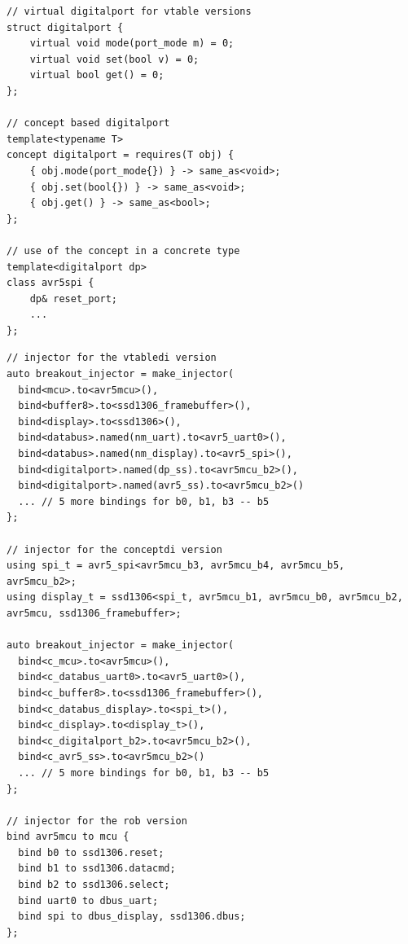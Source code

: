 \documentclass[10pt,sigplan,screen,anonymous]{acmart}
\begin{document}
\begin{lstlisting}[float=bp, caption=C++ interface implementation using abstract struct and concepts., label=lst:cppintfsconcept]
// virtual digitalport for vtable versions
struct digitalport {
    virtual void mode(port_mode m) = 0;
    virtual void set(bool v) = 0;
    virtual bool get() = 0;
};

// concept based digitalport
template<typename T>
concept digitalport = requires(T obj) {
    { obj.mode(port_mode{}) } -> same_as<void>;
    { obj.set(bool{}) } -> same_as<void>;
    { obj.get() } -> same_as<bool>;
};

// use of the concept in a concrete type
template<digitalport dp>
class avr5spi {
    dp& reset_port;
    ...
};
\end{lstlisting}




\begin{lstlisting}[float=bp, caption=Injectors for each DI-enabled version of breakout game., label=lst:cppbindings]
// injector for the vtabledi version
auto breakout_injector = make_injector(
  bind<mcu>.to<avr5mcu>(),
  bind<buffer8>.to<ssd1306_framebuffer>(),
  bind<display>.to<ssd1306>(),
  bind<databus>.named(nm_uart).to<avr5_uart0>(),
  bind<databus>.named(nm_display).to<avr5_spi>(),
  bind<digitalport>.named(dp_ss).to<avr5mcu_b2>(),
  bind<digitalport>.named(avr5_ss).to<avr5mcu_b2>()
  ... // 5 more bindings for b0, b1, b3 -- b5
};

// injector for the conceptdi version
using spi_t = avr5_spi<avr5mcu_b3, avr5mcu_b4, avr5mcu_b5, avr5mcu_b2>;
using display_t = ssd1306<spi_t, avr5mcu_b1, avr5mcu_b0, avr5mcu_b2, avr5mcu, ssd1306_framebuffer>;

auto breakout_injector = make_injector(
  bind<c_mcu>.to<avr5mcu>(),
  bind<c_databus_uart0>.to<avr5_uart0>(),
  bind<c_buffer8>.to<ssd1306_framebuffer>(),
  bind<c_databus_display>.to<spi_t>(),
  bind<c_display>.to<display_t>(),
  bind<c_digitalport_b2>.to<avr5mcu_b2>(),
  bind<c_avr5_ss>.to<avr5mcu_b2>()
  ... // 5 more bindings for b0, b1, b3 -- b5
};

// injector for the rob version
bind avr5mcu to mcu {
  bind b0 to ssd1306.reset;
  bind b1 to ssd1306.datacmd;
  bind b2 to ssd1306.select;
  bind uart0 to dbus_uart;
  bind spi to dbus_display, ssd1306.dbus;
};
\end{lstlisting}
\end{document}
